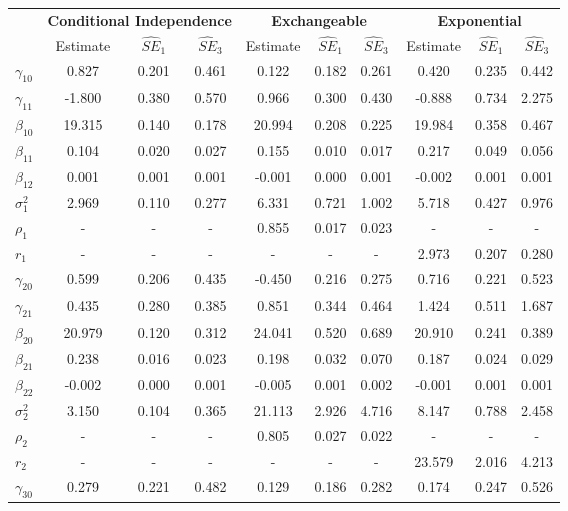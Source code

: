 \begin{table}[ht]
\begin{center}
\begin{tabular}{lccccccccc}
  \hline  &\multicolumn{3}{c}{\textbf{Conditional Independence}}&\multicolumn{3}{c}{\textbf{Exchangeable}}&\multicolumn{3}{c}{\textbf{Exponential}}\\ &Estimate&$\widehat{SE}_1$&$\widehat{SE}_3$&Estimate&$\widehat{SE}_1$&$\widehat{SE}_3$&Estimate&$\widehat{SE}_1$&$\widehat{SE}_3$\\\hline  $\gamma_{10}$ & 0.827 & 0.201 & 0.461 & 0.122 & 0.182 & 0.261 & 0.420 & 0.235 & 0.442 \\ 
 $\gamma_{11}$ & -1.800 & 0.380 & 0.570 & 0.966 & 0.300 & 0.430 & -0.888 & 0.734 & 2.275 \\ 
 $\beta_{10}$ & 19.315 & 0.140 & 0.178 & 20.994 & 0.208 & 0.225 & 19.984 & 0.358 & 0.467 \\ 
 $\beta_{11}$ & 0.104 & 0.020 & 0.027 & 0.155 & 0.010 & 0.017 & 0.217 & 0.049 & 0.056 \\ 
$\beta_{12}$ & 0.001 & 0.001 & 0.001 & -0.001 & 0.000 & 0.001 & -0.002 & 0.001 & 0.001 \\ 
 $\sigma_1^2$ & 2.969 & 0.110 & 0.277 & 6.331 & 0.721 & 1.002 & 5.718 & 0.427 & 0.976 \\ 
 $\rho_1$ & - & - & - & 0.855 & 0.017 & 0.023 & - & - & - \\ 
 $r_1$ & - & - & - & - & - & - & 2.973 & 0.207 & 0.280 \\ 
 $\gamma_{20}$ & 0.599 & 0.206 & 0.435 & -0.450 & 0.216 & 0.275 & 0.716 & 0.221 & 0.523 \\ 
     $\gamma_{21}$ & 0.435 & 0.280 & 0.385 & 0.851 & 0.344 & 0.464 & 1.424 & 0.511 & 1.687 \\ 
     $\beta_{20}$ & 20.979 & 0.120 & 0.312 & 24.041 & 0.520 & 0.689 & 20.910 & 0.241 & 0.389 \\ 
     $\beta_{21}$ & 0.238 & 0.016 & 0.023 & 0.198 & 0.032 & 0.070 & 0.187 & 0.024 & 0.029 \\ 
     $\beta_{22}$ & -0.002 & 0.000 & 0.001 & -0.005 & 0.001 & 0.002 & -0.001 & 0.001 & 0.001 \\ 
     $\sigma_2^2$ & 3.150 & 0.104 & 0.365 & 21.113 & 2.926 & 4.716 & 8.147 & 0.788 & 2.458 \\ 
     $\rho_2$ & - & - & - & 0.805 & 0.027 & 0.022 & - & - & - \\ 
     $r_2$ & - & - & - & - & - & - & 23.579 & 2.016 & 4.213 \\ 
 $\gamma_{30}$ & 0.279 & 0.221 & 0.482 & 0.129 & 0.186 & 0.282 & 0.174 & 0.247 & 0.526 \\ 

\end{tabular}
\end{center}
\end{table}
